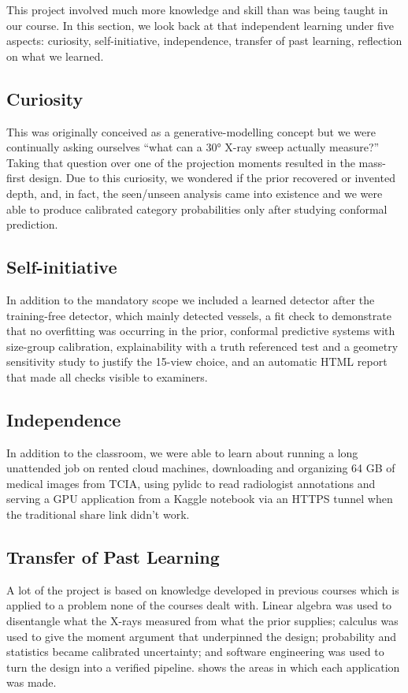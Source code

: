 This project involved much more knowledge and skill than was being taught in our course. In this section, we look back at that independent learning under five aspects: curiosity, self-initiative, independence, transfer of past learning, reflection on what we learned.

\subsection{Curiosity}
This was originally conceived as a generative-modelling concept but we were continually asking ourselves ``what can a \ang{30} X-ray sweep actually measure?'' Taking that question over one of the projection moments resulted in the mass-first design. Due to this curiosity, we wondered if the prior recovered or invented depth, and, in fact, the seen/unseen analysis came into existence and we were able to produce calibrated category probabilities only after studying conformal prediction.

\subsection{Self-initiative}
In addition to the mandatory scope we included a learned detector after the training-free detector, which mainly detected vessels, a fit check to demonstrate that no overfitting was occurring in the prior, conformal predictive systems with size-group calibration, explainability with a truth referenced test and a geometry sensitivity study to justify the 15-view choice, and an automatic HTML report that made all checks visible to examiners.

\subsection{Independence}
In addition to the classroom, we were able to learn about running a long unattended job on rented cloud machines, downloading and organizing 64 GB of medical images from TCIA, using pylidc to read radiologist annotations and serving a GPU application from a Kaggle notebook via an HTTPS tunnel when the traditional share link didn't work.

\subsection{Transfer of Past Learning}
A lot of the project is based on knowledge developed in previous courses which is applied to a problem none of the courses dealt with. Linear algebra was used to disentangle what the X-rays measured from what the prior supplies; calculus was used to give the moment argument that underpinned the design; probability and statistics became calibrated uncertainty; and software engineering was used to turn the design into a verified pipeline.  shows the areas in which each application was made.

